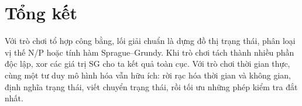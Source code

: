 \documentclass[11pt]{article}
\begin{document}
\section*{Tổng kết}

Với trò chơi tổ hợp công bằng, lối giải chuẩn là dựng đồ thị trạng thái,
phân loại vị thế N/P hoặc tính hàm Sprague--Grundy. Khi trò chơi tách thành
nhiều phần độc lập, xor các giá trị SG cho ta kết quả toàn cục. Với trò chơi
thời gian thực, cùng một tư duy mô hình hóa vẫn hữu ích: rời rạc hóa thời gian
và không gian, định nghĩa trạng thái, viết chuyển trạng thái, rồi tối ưu những
phép kiểm tra đắt nhất.
\end{document}
